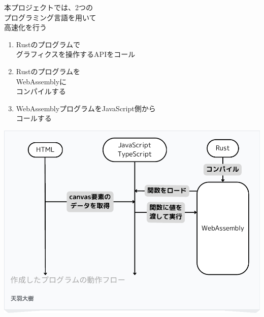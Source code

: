 \begin{minipage}[t]{0.4\textwidth}\vspace{0pt}
本プロジェクトでは、2つの\\プログラミング言語を用いて\\高速化を行う

\begin{enumerate}[parsep=-0.5\zh]
	\item Rustのプログラムで\\グラフィクスを操作するAPIをコール
	\item Rustのプログラムを\\WebAssemblyに\\コンパイルする
	\item WebAssemblyプログラムをJavaScript側から\\コールする
\end{enumerate}
\end{minipage}
\begin{minipage}[t]{0.6\textwidth}\vspace{0pt}
\begin{center}
\includegraphics[keepaspectratio, width=.9\linewidth,trim={0mm 0mm 0mm 0mm},clip]{fig/system.pdf}
\end{center}
\end{minipage}

